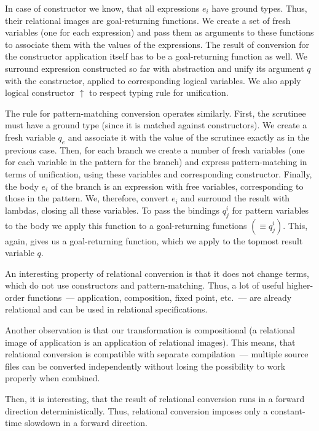 In case of constructor we know, that all expressions $e_i$ have ground types. Thus, their relational images are goal-returning
functions. We create a set of fresh variables (one for each expression) and pass them as arguments to these functions to associate
them with the values of the expressions. The result of conversion for the constructor application itself has to be a 
goal-returning function as well. We surround expression constructed so far with abstraction and unify its argument $q$ with the
constructor, applied to corresponding logical variables. We also apply logical constructor $\uparrow$ to respect typing rule
for unification.

The rule for pattern-matching conversion operates similarly. First, the scrutinee must have a ground type (since it is matched against
constructors). We create a fresh variable $q_e$ and associate it with the value of the scrutinee exactly as in the previous
case. Then, for each branch we create a number of fresh variables (one for each variable in the pattern for the branch) and
express pattern-matching in terms of unification, using these variables and corresponding constructor. Finally, the body $e_i$ of the branch
is an expression with free variables, corresponding to those in the pattern. We, therefore, convert $e_i$ and surround the result with
lambdas, closing all these variables. To pass the bindings $q^i_j$ for pattern variables to the body we apply this function to
a goal-returning functions $(\equiv q^i_j)$. This, again, gives us a goal-returning function, which we apply to the topmost result variable $q$.

An interesting property of relational conversion is that it does not change terms, which do not use constructors and pattern-matching. Thus,
a lot of useful higher-order functions~--- application, composition, fixed point, etc.~--- are already relational and can be used in
relational specifications.

Another observation is that our transformation is compositional (a relational image of application is an application of relational
images). This means, that relational conversion is compatible with separate compilation~--- multiple source files can be
converted independently without losing the possibility to work properly when combined.

Then, it is interesting, that the result of relational conversion runs in a forward direction
deterministically. Thus, relational conversion imposes only a constant-time slowdown in a forward
direction.

